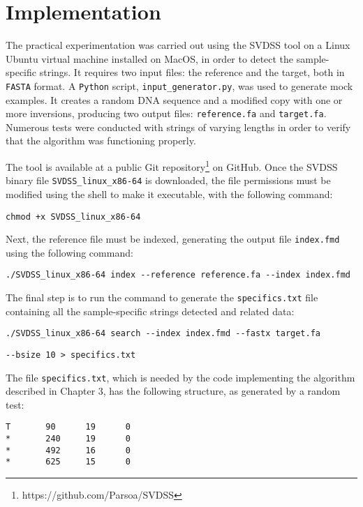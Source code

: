 \section{Implementation}
The practical experimentation was carried out using the SVDSS \cite{khorsand_parsoasvdss_2024} tool on a Linux Ubuntu virtual machine installed on MacOS, in order to detect the sample-specific strings. It requires two input files: the reference and the target, both in \texttt{FASTA} format. A \texttt{Python} script, \texttt{input\_generator.py}, was used to generate mock examples. It creates a random DNA sequence and a modified copy with one or more inversions, producing two output files: \texttt{reference.fa} and \texttt{target.fa}. Numerous tests were conducted with strings of varying lengths in order to verify that the algorithm was functioning properly.

The tool is available at a public Git repository\footnote{https://github.com/Parsoa/SVDSS} on GitHub. Once the SVDSS binary file \texttt{SVDSS\_linux\_x86-64} is downloaded, the file permissions must be modified using the shell to make it executable, with the following command: 

\begin{verbatim}
chmod +x SVDSS_linux_x86-64
\end{verbatim}

Next, the reference file must be indexed, generating the output file \texttt{index.fmd} using the following command: 

\begin{verbatim}
./SVDSS_linux_x86-64 index --reference reference.fa --index index.fmd
\end{verbatim}

The final step is to run the command to generate the \texttt{specifics.txt} file containing all the sample-specific strings detected and related data: 

\begin{verbatim}
./SVDSS_linux_x86-64 search --index index.fmd --fastx target.fa  
\end{verbatim}

\begin{verbatim}
--bsize 10 > specifics.txt
\end{verbatim}

The file \texttt{specifics.txt}, which is needed by the code implementing the algorithm described in Chapter 3, has the following structure, as generated by a random test:

\begin{verbatim}
T       90      19      0
*       240     19      0
*       492     16      0
*       625     15      0
\end{verbatim}

